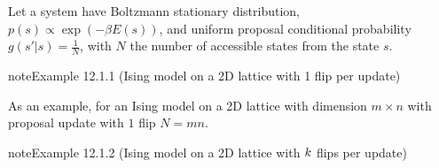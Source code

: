 \documentclass[letterpaper,10pt,english]{jupyterBook}
\begin{document}
\sphinxAtStartPar
{} Let a system have Boltzmann stationary distribution, \(p(s) \propto \exp\left( - \beta E(s) \right)\), and uniform proposal conditional probability \(g(s'|s) = \frac{1}{N}\), with \(N\) the number of accessible states from the state \(s\).
\label{ch/statistical-mechanics/ising-notes:example-0}
\begin{sphinxadmonition}{note}{Example 12.1.1 (Ising model on a 2D lattice with 1 flip per update)}



\sphinxAtStartPar
As an example, for an Ising model on a 2D lattice with dimension \(m \times n\) with proposal update with \(1\) flip \(N = mn\).
\end{sphinxadmonition}
\label{ch/statistical-mechanics/ising-notes:example-1}
\begin{sphinxadmonition}{note}{Example 12.1.2 (Ising model on a 2D lattice with \protect\(k\protect\) flips per update)}



\sphinxAtStartPar
{} 


\end{sphinxadmonition}
\end{document}
